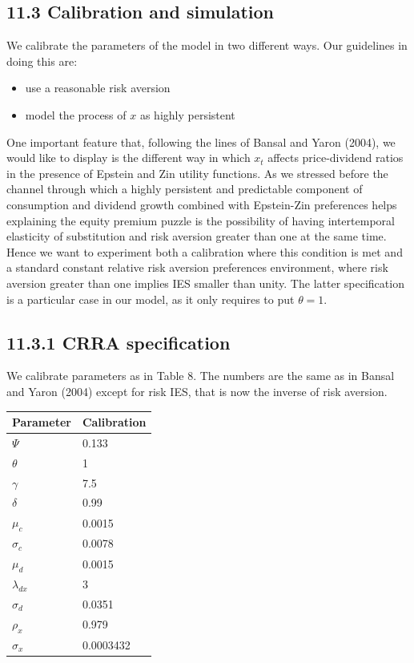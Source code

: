 \documentclass[10pt]{article}
\begin{document}
\subsection*{11.3 Calibration and simulation}
We calibrate the parameters of the model in two different ways. Our guidelines in doing this are:

\begin{itemize}
  \item use a reasonable risk aversion
  \item model the process of $x$ as highly persistent
\end{itemize}

One important feature that, following the lines of Bansal and Yaron (2004), we would like to display is the different way in which $x_{t}$ affects price-dividend ratios in the presence of Epstein and Zin utility functions. As we stressed before the channel through which a highly persistent and predictable component of consumption and dividend growth combined with Epstein-Zin preferences helps explaining the equity premium puzzle is the possibility of having intertemporal elasticity of substitution and risk aversion greater than one at the same time. Hence we want to experiment both a calibration where this condition is met and a standard constant relative risk aversion preferences environment, where risk aversion greater than one implies IES smaller than unity. The latter specification is a particular case in our model, as it only requires to put $\theta=1$.

\subsection*{11.3.1 CRRA specification}
We calibrate parameters as in Table 8. The numbers are the same as in Bansal and Yaron (2004) except for risk IES, that is now the inverse of risk aversion.

\begin{center}
\begin{tabular}{|l|l|}
\hline
Parameter & Calibration \\
\hline
$\Psi$ & 0.133 \\
\hline
$\theta$ & 1 \\
\hline
$\gamma$ & 7.5 \\
\hline
$\delta$ & 0.99 \\
\hline
$\mu_{c}$ & 0.0015 \\
\hline
$\sigma_{c}$ & 0.0078 \\
\hline
$\mu_{d}$ & 0.0015 \\
\hline
$\lambda_{d x}$ & 3 \\
\hline
$\sigma_{d}$ & 0.0351 \\
\hline
$\rho_{x}$ & 0.979 \\
\hline
$\sigma_{x}$ & 0.0003432 \\
\hline
\end{tabular}
\end{center}
\end{document}
